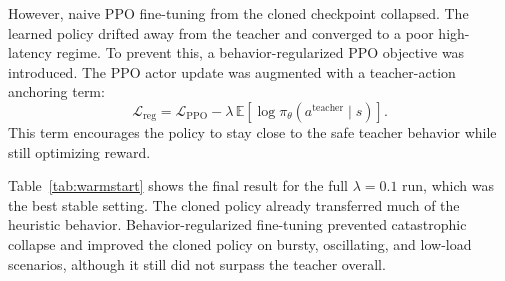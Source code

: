 \documentclass[conference]{IEEEtran}
\begin{document}
However, naive PPO fine-tuning from the cloned checkpoint collapsed. The learned policy drifted away from the teacher and converged to a poor high-latency regime. To prevent this, a behavior-regularized PPO objective was introduced. The PPO actor update was augmented with a teacher-action anchoring term:
\begin{equation}
\mathcal{L}_{\text{reg}} = \mathcal{L}_{\text{PPO}} - \lambda \, \mathbb{E}\left[\log \pi_\theta(a^{\text{teacher}} \mid s)\right].
\end{equation}
This term encourages the policy to stay close to the safe teacher behavior while still optimizing reward.

Table~\ref{tab:warmstart} shows the final result for the full $\lambda=0.1$ run, which was the best stable setting. The cloned policy already transferred much of the heuristic behavior. Behavior-regularized fine-tuning prevented catastrophic collapse and improved the cloned policy on bursty, oscillating, and low-load scenarios, although it still did not surpass the teacher overall.
\end{document}
